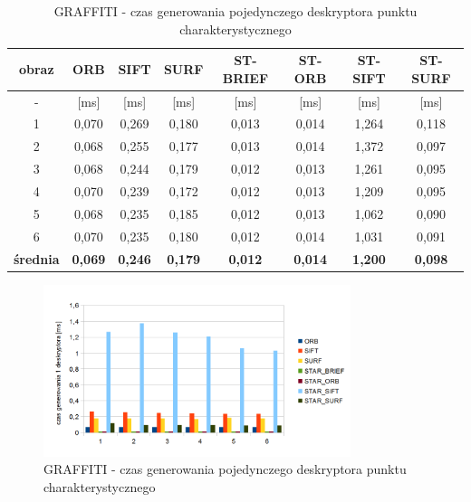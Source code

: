 \begin{table}[htbp]
  \centering
  \caption{GRAFFITI - czas generowania pojedynczego deskryptora punktu charakterystycznego}
    \begin{tabular}{|c|c|c|c|c|c|c|c|}\hline

    obraz & \textbf{ORB} & \textbf{SIFT} & \textbf{SURF} & \textbf{ST-BRIEF} & \textbf{ST-ORB} & \textbf{ST-SIFT} & \textbf{ST-SURF} \\\hline

    - & [ms] & [ms] & [ms] & [ms] & [ms] & [ms] & [ms] \\\hline
    1 & 0,070 & 0,269 & 0,180 & 0,013 & 0,014 & 1,264 & 0,118 \\
    2 & 0,068 & 0,255 & 0,177 & 0,013 & 0,014 & 1,372 & 0,097 \\
    3 & 0,068 & 0,244 & 0,179 & 0,012 & 0,013 & 1,261 & 0,095 \\
    4 & 0,070 & 0,239 & 0,172 & 0,012 & 0,013 & 1,209 & 0,095 \\
    5 & 0,068 & 0,235 & 0,185 & 0,012 & 0,013 & 1,062 & 0,090 \\
    6 & 0,070 & 0,235 & 0,180 & 0,012 & 0,014 & 1,031 & 0,091 \\\hline
    \textbf{średnia} & \textbf{0,069} & \textbf{0,246} & \textbf{0,179} & \textbf{0,012} & \textbf{0,014} & \textbf{1,200} & \textbf{0,098} \\\hline
   
    \end{tabular}%
  \label{tab:graffiti_f3}%
\end{table}%


\begin{figure}
\centering
\includegraphics[width=0.8\textwidth]{pict/mikolajczyk/graff/f3.png}
\caption{GRAFFITI - czas generowania pojedynczego deskryptora punktu charakterystycznego}
\end{figure}


